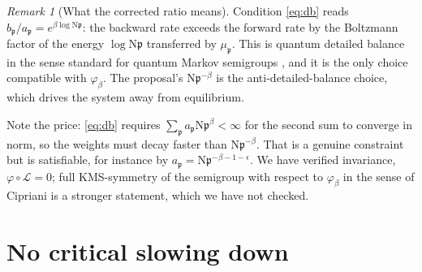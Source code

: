 \documentclass[11pt]{amsart}
\numberwithin{equation}{section}
\theoremstyle{definition}
\theoremstyle{remark}
\newtheorem{remark}[theorem]{Remark}
\newcommand{\cL}{\mathcal{L}}
\newcommand{\pp}{\mathfrak{p}}
\newcommand{\Ns}{\mathrm{N}}
\begin{document}
\begin{remark}[What the corrected ratio means]\label{rem:dbmeaning}
Condition \eqref{eq:db} reads $b_\pp/a_\pp=e^{\beta\log\Ns\pp}$: the backward rate exceeds
the forward rate by the Boltzmann factor of the energy $\log\Ns\pp$ transferred by
$\mu_\pp$. This is quantum detailed balance in the sense standard for quantum Markov
semigroups \cite{CarlenMaas}, and it is the only choice compatible with
$\varphi_\beta$. The proposal's $\Ns\pp^{-\beta}$ is the anti-detailed-balance choice, which
drives the system away from equilibrium.

Note the price: \eqref{eq:db} requires $\sum_\pp a_\pp\Ns\pp^{\beta}<\infty$ for the second
sum to converge in norm, so the weights must decay faster than $\Ns\pp^{-\beta}$. That is a
genuine constraint but is satisfiable, for instance by $a_\pp=\Ns\pp^{-\beta-1-\epsilon}$.
We have verified invariance, $\varphi\circ\cL=0$; full KMS-symmetry of the semigroup with
respect to $\varphi_\beta$ in the sense of Cipriani \cite{Cipriani} is a stronger statement,
which we have not checked.
\end{remark}

\section{No critical slowing down}
\end{document}
